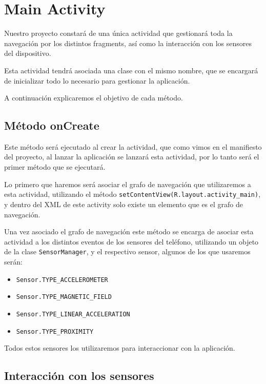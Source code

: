 \section{Main Activity}

Nuestro proyecto constará de una única actividad que gestionará toda la navegación por los distintos fragments, así como la interacción con los sensores del dispositivo.

Esta actividad tendrá asociada una clase con el mismo nombre, que se encargará de inicializar todo lo necesario para gestionar la aplicación.

A continuación explicaremos el objetivo de cada método.

\subsection{Método onCreate}

Este método será ejecutado al crear la actividad, que como vimos en el manifiesto del proyecto, al lanzar la aplicación se lanzará esta actividad, por lo tanto será el primer método que se ejecutará.



Lo primero que haremos será asociar el grafo de navegación que utilizaremos a esta actividad, utilizando el método \texttt{setContentView(R.layout.activity\_main)}, y dentro del XML de este activity solo existe un elemento que es el grafo de navegación.

Una vez asociado el grafo de navegación este método se encarga de asociar esta actividad a los distintos eventos de los sensores del teléfono, utilizando un objeto de la clase \texttt{SensorManager}, y el respectivo sensor, algunos de los que usaremos serán:

\begin{itemize}
	\item \texttt{Sensor.TYPE\_ACCELEROMETER}
	\item \texttt{Sensor.TYPE\_MAGNETIC\_FIELD}
	\item \texttt{Sensor.TYPE\_LINEAR\_ACCELERATION}
	\item \texttt{Sensor.TYPE\_PROXIMITY}

\end{itemize}

Todos estos sensores los utilizaremos para interaccionar con la aplicación.


\subsection{Interacción con los sensores}

